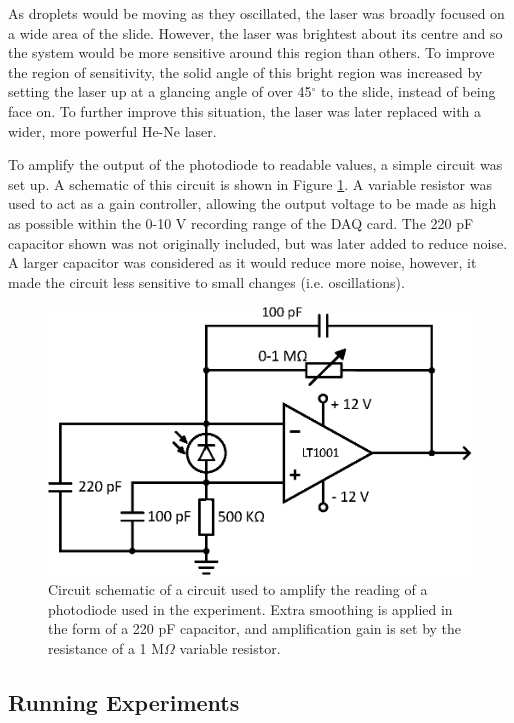 \documentclass{physics_article_B}
\begin{document}
        As droplets would be moving as they oscillated, the laser was broadly focused on a wide area of the slide. However, the laser was brightest about its centre and so the system would be more sensitive around this region than others. To improve the region of sensitivity, the solid angle of this bright region was increased by setting the laser up at a glancing angle of over 45$^{\circ}$ to the slide, instead of being face on. To further improve this situation, the laser was later replaced with a wider, more powerful He-Ne laser.
        
        To amplify the output of the photodiode to readable values, a simple circuit was set up\cite{artofelectronics}. A schematic of this circuit is shown in Figure \ref{fig:PDCircuit}. A variable resistor was used to act as a gain controller, allowing the output voltage to be made as high as possible within the 0-10 V recording range of the DAQ card. The 220 pF capacitor shown was not originally included, but was later added to reduce noise. A larger capacitor was considered as it would reduce more noise, however, it made the circuit less sensitive to small changes (i.e. oscillations).
    
        \begin{figure}[H]
            \centering
            \includegraphics[scale=0.8]{Figures/PDCircuit.eps}
            \caption{Circuit schematic of a circuit used to amplify the reading of a photodiode used in the experiment. Extra smoothing is applied in the form of a 220 pF capacitor, and amplification gain is set by the resistance of a 1 M$\Omega$ variable resistor.}
            \label{fig:PDCircuit}
        \end{figure}
    

    \subsection{Running Experiments\label{sect:method:exp}}
        
\end{document}
